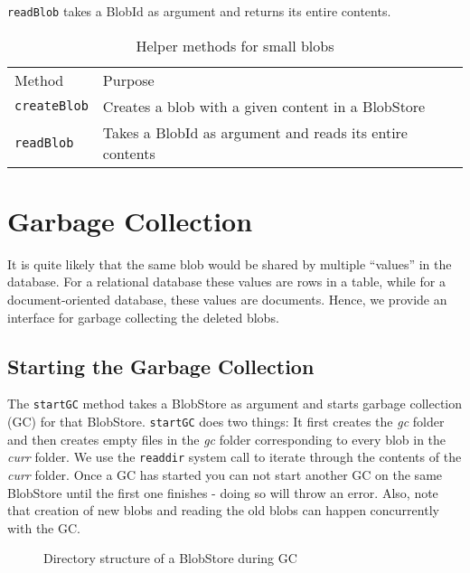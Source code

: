 \texttt{readBlob} takes a BlobId as argument and returns its entire contents.

\begin{table}[hbt]
\caption{Helper methods for small blobs}
\label{tab:interface-small-blob}
\begin{center}
  \begin{tabularx}{0.91\textwidth}{lX}
    \hline\noalign{\smallskip}
    Method & Purpose \\
    \noalign{\smallskip}
    \hline
    \noalign{\smallskip}
    \texttt{createBlob} & Creates a blob with a given content in a BlobStore \\
    \texttt{readBlob} & Takes a BlobId as argument and reads its entire contents \\
    \hline
  \end{tabularx}
\end{center}
\end{table}

\section{Garbage Collection}
It is quite likely that the same blob would be shared by multiple ``values'' in the database. For a relational database these values are rows in a table, while for a document-oriented database, these values are documents.
Hence, we provide an interface for garbage collecting the deleted blobs.

\subsection{Starting the Garbage Collection}
The \texttt{startGC} method takes a BlobStore as argument and starts garbage collection (GC) for that BlobStore.
\texttt{startGC} does two things: It first creates the \textit{gc} folder and then creates empty files in the \textit{gc} folder corresponding to every blob in the \textit{curr} folder.
We use the \texttt{readdir} system call to iterate through the contents of the \textit{curr} folder.
Once a GC has started you can not start another GC on the same BlobStore until the first one finishes - doing so will throw an error. Also, note that creation of new blobs and reading the old blobs can happen concurrently with the GC.

\begin{figure}[hbt]
  \caption{Directory structure of a BlobStore during GC}
  \label{fig:blobstore-dirstructure-gc}
\end{figure}

